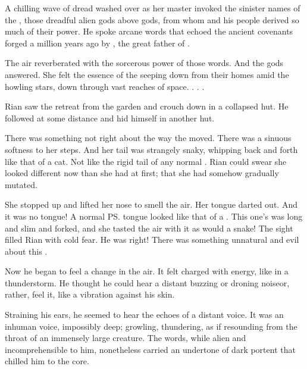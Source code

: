 A chilling wave of dread washed over \Criseis{} as her master invoked the sinister names of the \xzaishanns, those dreadful alien gods above gods, from whom \Ishnaruchaefir{} and his people derived so much of their power. 
He spoke arcane words that echoed the ancient covenants forged a million years ago by \Sethicus, the great father of \dragons. 

The air reverberated with the sorcerous power of those words. 
And the gods answered. 
She felt the essence of the \xss seeping down from their homes amid the howling stars, down through vast reaches of space. 
\KyaethemChreiAz. 
\KhothSell.
\NaathKurRamalech. 




\begin{comment}
  \subsection{Rian sees vortex}
\end{comment}
\new
Rian saw the \sphyle retreat from the garden and crouch down in a collapsed hut. 
He followed at some distance and hid himself in another hut. 

There was something not right about the way the \sphyle moved. 
There was a sinuous softness to her steps. 
And her tail was strangely snaky, whipping back and forth like that of a cat. 
Not like the rigid tail of any normal \scatha. 
Rian could swear she looked different now than she had at first; that she had somehow gradually mutated. 

She stopped up and lifted her nose to smell the air. 
Her tongue darted out. 
And it was no \scathaese{} tongue! 
A normal \ps{\scatha} tongue looked like that of a {\human}. 
This one's was long and slim and forked, and she tasted the air with it as would a snake!
The sight filled Rian with cold fear. 
He was right!
There was something unnatural and evil about this \scatha. 

Now he began to feel a change in the air. 
It felt charged with energy, like in a thunderstorm.
He thought he could hear a distant buzzing or droning noise\dash or, rather, feel it, like a vibration against his skin. 


Straining his ears, he seemed to hear the echoes of a distant voice. 
It was an inhuman voice, impossibly deep; growling, thundering, as if resounding from the throat of an immensely large creature. 
The words, while alien and incomprehensible to him, nonetheless carried an undertone of dark portent that chilled him to the core. 

